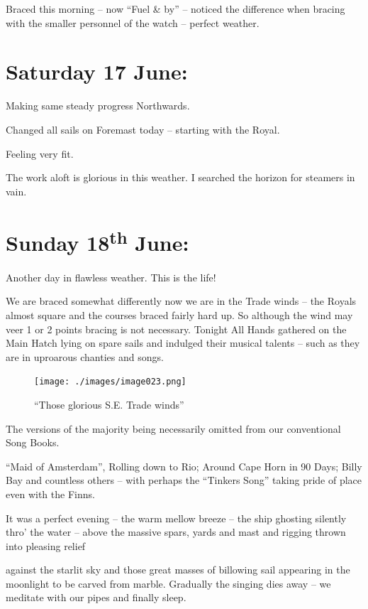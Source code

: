 \documentclass[
  11pt,
  msmallroyalvopaper
]{memoir}
\begin{document}
Braced this morning -- now ``Fuel \& by'' -- noticed the difference when
bracing with the smaller personnel of the watch -- perfect weather.

\hypertarget{saturday-17-june}{%
\section{Saturday 17 June:}\label{saturday-17-june}}

Making same steady progress Northwards.

Changed all sails on Foremast today -- starting with the Royal.

Feeling very fit.

The work aloft is glorious in this weather. I searched the horizon for
steamers in vain.

\hypertarget{sunday-18th-june}{%
\section{\texorpdfstring{Sunday 18\textsuperscript{th}
June:}{Sunday 18th June:}}\label{sunday-18th-june}}

Another day in flawless weather. This is the life!

We are braced somewhat differently now we are in the Trade winds -- the
Royals almost square and the courses braced fairly hard up. So although
the wind may veer 1 or 2 points bracing is not necessary. Tonight All
Hands gathered on the Main Hatch lying on spare sails and indulged their
musical talents -- such as they are in uproarous chanties and songs.

\begin{figure}
\centering
\texttt{[image: ./images/image023.png]}
\caption{``Those glorious S.E. Trade winds''}
\end{figure}

The versions of the majority being necessarily omitted from our
conventional Song Books.

``Maid of Amsterdam'', Rolling down to Rio; Around Cape Horn in 90 Days;
Billy Bay and countless others -- with perhaps the ``Tinkers Song''
taking pride of place even with the Finns.

It was a perfect evening -- the warm mellow breeze -- the ship ghosting
silently thro' the water -- above the massive spars, yards and mast and
rigging thrown into pleasing relief

against the starlit sky and those great masses of billowing sail
appearing in the moonlight to be carved from marble. Gradually the
singing dies away -- we meditate with our pipes and finally sleep.
\end{document}
